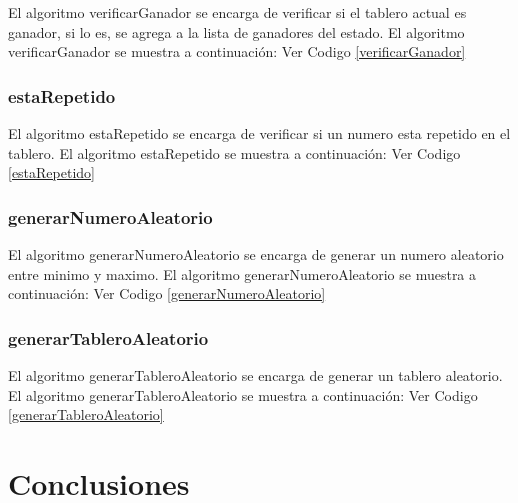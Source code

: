 \documentclass[10pt,twocolumn]{article}
\begin{document}
El algoritmo verificarGanador se encarga de verificar si el tablero actual es ganador, si lo es, se agrega a la lista de ganadores del estado. El algoritmo verificarGanador se muestra a continuación:
Ver Codigo \ref{verificarGanador}

\subsubsection{estaRepetido}

El algoritmo estaRepetido se encarga de verificar si un numero esta repetido en el tablero. El algoritmo estaRepetido se muestra a continuación:
Ver Codigo \ref{estaRepetido}

\subsubsection{generarNumeroAleatorio}

El algoritmo generarNumeroAleatorio se encarga de generar un numero aleatorio entre minimo y maximo. El algoritmo generarNumeroAleatorio se muestra a continuación:
Ver Codigo \ref{generarNumeroAleatorio}

\subsubsection{generarTableroAleatorio}

El algoritmo generarTableroAleatorio se encarga de generar un tablero aleatorio. El algoritmo generarTableroAleatorio se muestra a continuación:
Ver Codigo \ref{generarTableroAleatorio}


\section{Conclusiones}





\end{document}
